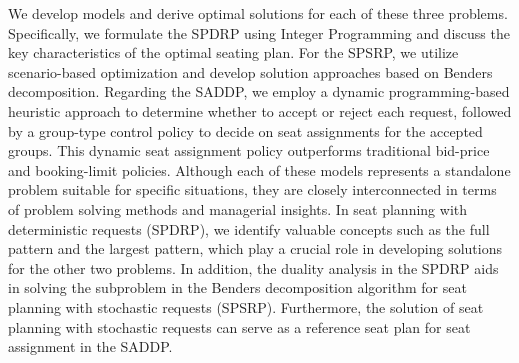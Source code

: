 
We develop models and derive optimal solutions for each of these three problems. Specifically, we formulate the SPDRP using Integer Programming and discuss the key characteristics of the optimal seating plan. For the SPSRP, we utilize scenario-based optimization and develop solution approaches based on Benders decomposition. Regarding the SADDP, we employ a dynamic programming-based heuristic approach to determine whether to accept or reject each request, followed by a group-type control policy to decide on seat assignments for the accepted groups. This dynamic seat assignment policy outperforms traditional bid-price and booking-limit policies. Although each of these models represents a standalone problem suitable for specific situations, they are closely interconnected in terms of problem solving methods and managerial insights. In seat planning with deterministic requests (SPDRP), we identify valuable concepts such as the full pattern and the largest pattern, which play a crucial role in developing solutions for the other two problems. In addition, the duality analysis in the SPDRP aids in solving the subproblem in the Benders decomposition algorithm for seat planning with stochastic requests (SPSRP). Furthermore, the solution of seat planning with stochastic requests can serve as a reference seat plan for seat assignment in the SADDP. 



